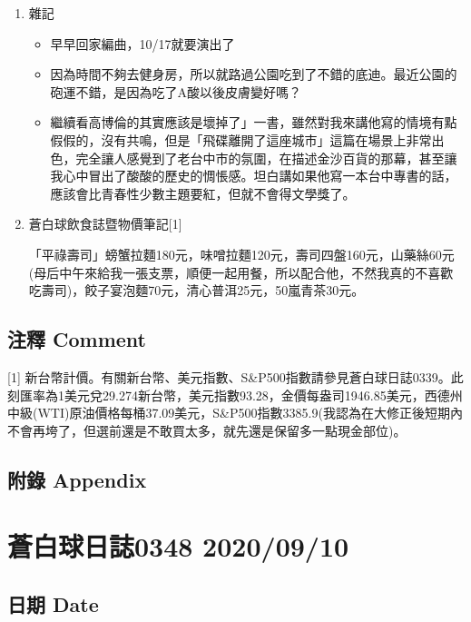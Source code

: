 \documentclass[a5paper, 11pt
]{book}
\providecommand{\tightlist}{%
  \setlength{\itemsep}{0pt}\setlength{\parskip}{0pt}}
\begin{document}
\begin{enumerate}
\def\labelenumi{\arabic{enumi}.}
\item
  雜記

  \begin{itemize}
  \tightlist
  \item
    早早回家編曲，10/17就要演出了
  \item
    因為時間不夠去健身房，所以就路過公園吃到了不錯的底迪。最近公園的砲運不錯，是因為吃了A酸以後皮膚變好嗎？
  \item
    繼續看高博倫的其實應該是壞掉了」一書，雖然對我來講他寫的情境有點假假的，沒有共鳴，但是「飛碟離開了這座城市」這篇在場景上非常出色，完全讓人感覺到了老台中市的氛圍，在描述金沙百貨的那幕，甚至讓我心中冒出了酸酸的歷史的惆悵感。坦白講如果他寫一本台中專書的話，應該會比青春性少數主題要紅，但就不會得文學獎了。
  \end{itemize}
\item
  蒼白球飲食誌暨物價筆記{[}1{]}

  「平祿壽司」螃蟹拉麵180元，味噌拉麵120元，壽司四盤160元，山藥絲60元(母后中午來給我一張支票，順便一起用餐，所以配合他，不然我真的不喜歡吃壽司)，餃子宴泡麵70元，清心普洱25元，50嵐青茶30元。
\end{enumerate}

\hypertarget{ux6ce8ux91cb-comment-8}{%
\subsection{注釋 Comment}\label{ux6ce8ux91cb-comment-8}}

{[}1{]}
新台幣計價。有關新台幣、美元指數、S\&P500指數請參見蒼白球日誌0339。此刻匯率為1美元兌29.274新台幣，美元指數93.28，金價每盎司1946.85美元，西德州中級(WTI)原油價格每桶37.09美元，S\&P500指數3385.9(我認為在大修正後短期內不會再垮了，但選前還是不敢買太多，就先還是保留多一點現金部位)。

\hypertarget{ux9644ux9304-appendix-8}{%
\subsection{附錄 Appendix}\label{ux9644ux9304-appendix-8}}

\hypertarget{ux84bcux767dux7403ux65e5ux8a8c0348-20200910}{%
\section{蒼白球日誌0348
2020/09/10}\label{ux84bcux767dux7403ux65e5ux8a8c0348-20200910}}

\hypertarget{ux65e5ux671f-date-9}{%
\subsection{日期 Date}\label{ux65e5ux671f-date-9}}
\end{document}
